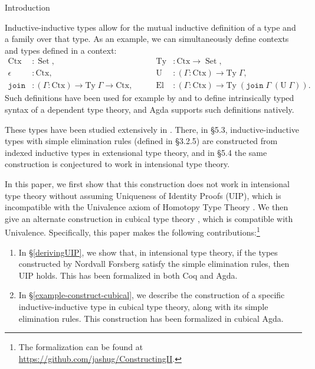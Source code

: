 \documentclass[runningheads]{llncs}
\DeclareMathOperator{\USet}{Set}
\newcommand{\join}{\texttt{join}}
\def\Forsberg/{Nordvall Forsberg}
\begin{document}
\begin{section}{Introduction}
    
Inductive-inductive types allow for the mutual inductive definition of a type and a family over that type. As an example,
we can simultaneously define contexts and types defined in a context:
\begin{align*}
\text{Ctx} &: \USet,\qquad
&\text{Ty} &: \text{Ctx} \to \USet,\\
\epsilon &: \text{Ctx},\qquad
&\text{U} &: (\Gamma : \text{Ctx}) \to \text{Ty}\;\Gamma,\\
\join &: (\Gamma : \text{Ctx}) \to \text{Ty}\; \Gamma \to \text{Ctx},\qquad
&\text{El} &: (\Gamma : \text{Ctx}) \to \text{Ty}\;(\join\;\Gamma\;(\text{U}\;\Gamma)).
\end{align*}
Such definitions have been used for example by \citet{danielssonIRdeptype} and \citet{CHAPMAN200921} to define intrinsically typed syntax of a dependent type theory, and Agda supports such definitions natively.

These types have been studied extensively in \citet{nordvallforsberg2013thesis}. There, in \S5.3, inductive-inductive types with simple elimination rules (defined in \S3.2.5) are constructed from indexed inductive types in extensional type theory, and in \S5.4 the same construction is conjectured to work in intensional type theory.

In this paper, we first show that this construction does not work in intensional type theory without assuming Uniqueness of Identity Proofs (UIP), which is incompatible with the Univalence axiom of Homotopy Type Theory \citep{hottbook}. We then give an alternate construction in cubical type theory \citep{cubicaltt_ifcolog}, which is compatible with Univalence.
Specifically, this paper makes the following contributions:\footnote{The formalization can be found at \url{https://github.com/jashug/ConstructingII}.}
\begin{enumerate}
    \item In \S\ref{derivingUIP}, we show that, in intensional type theory, if the types constructed by \Forsberg/ satisfy the simple elimination rules, then UIP holds. This has been formalized in both Coq and Agda.
    \item In \S\ref{example-construct-cubical}, we describe the construction of a specific inductive-inductive type in cubical type theory, along with its simple elimination rules. This construction has been formalized in cubical Agda.
\end{enumerate}


\end{section}
\end{document}
